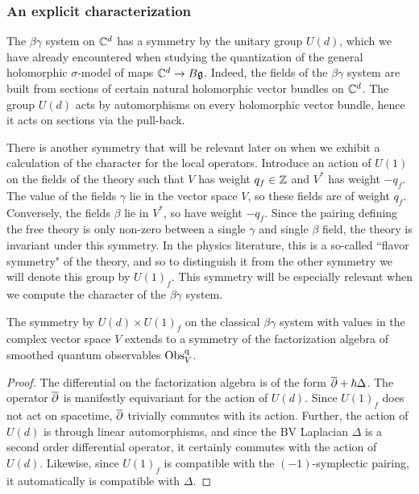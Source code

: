 \documentclass[10pt]{amsart}
\begin{document}
\subsubsection{An explicit characterization}

The $\beta\gamma$ system on $\mathbb C^d$ has a symmetry by the unitary group $U(d)$, which we have already encountered when studying the quantization of the general holomorphic $\sigma$-model of maps $\mathbb C^d \to B \mathfrak g$. 
Indeed, the fields of the $\beta\gamma$ system are built from sections of certain natural holomorphic vector bundles on $\mathbb C^d$. 
The group $U(d)$ acts by automorphisms on every holomorphic vector bundle, hence it acts on sections via the pull-back. 

There is another symmetry that will be relevant later on when we exhibit a calculation of the character for the local operators.
Introduce an action of $U(1)$ on the fields of the theory such that $V$ has weight $q_f \in \mathbb Z$ and $V^*$ has weight $-q_f$.
The value of the fields $\gamma$ lie in the vector space $V$, so these fields are of weight $q_f$. 
Conversely, the fields $\beta$ lie in $V^*$, so have weight $-q_f$.
Since the pairing defining the free theory is only non-zero between a single $\gamma$ and single $\beta$ field, the theory is invariant under this symmetry.
In the physics literature, this is a so-called ``flavor symmetry" of the theory, and so to distinguish it from the other symmetry we will denote this group by $U(1)_f$. 
This symmetry will be especially relevant when we compute the character of the $\beta \gamma$ system.

\begin{lem}\label{lem U(d) equivariance}  The symmetry by $U(d) \times U(1)_f$ on the classical $\beta\gamma$ system with values in the complex vector space $V$ extends to a symmetry of the factorization algebra of smoothed quantum observables ${\rm Obs}^{{\rm q}}_V$.
\end{lem}

\begin{proof}
The differential on the factorization algebra is of the form $\overline{\partial} + \hbar \Delta$. 
The operator $\overline{\partial}$ is manifestly equivariant for the action of $U(d)$.
Since $U(1)_f$ does not act on spacetime, $\overline{\partial}$ trivially commutes with its action. Further, the action of $U(d)$ is through linear automorphisms, and since the BV Laplacian $\Delta$ is a second order differential operator, it certainly commutes with the action of $U(d)$. 
Likewise, since $U(1)_f$ is compatible with the $(-1)$-symplectic pairing, it automatically is compatible with $\Delta$. 
\end{proof}
\end{document}
